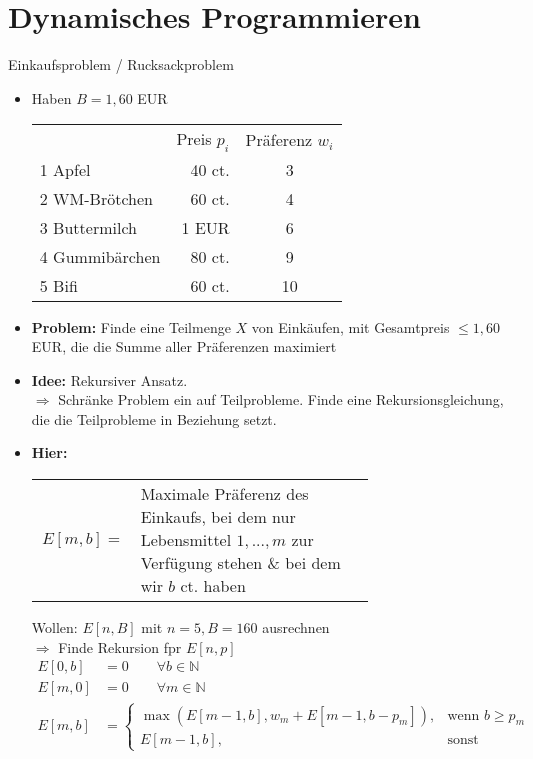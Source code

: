\section{Dynamisches Programmieren}
\Bsp Einkaufsproblem / Rucksackproblem
\begin{itemize}
 \item Haben $B = 1{,}60$ EUR
        \begin{center}
            \begin{tabular}{lr|c}
                & Preis $p_i$ & Präferenz $w_i$ \\
                1 Apfel & 40 ct. & 3 \\
                2 WM-Brötchen & 60 ct. & 4 \\
                3 Buttermilch & 1 EUR & 6 \\
                4 Gummibärchen & 80 ct. & 9 \\
                5 Bifi & 60 ct. & 10 \\ 
            \end{tabular}
        \end{center}
 \item \textbf{Problem:} Finde eine Teilmenge $X$ von Einkäufen, mit Gesamtpreis $\leq 1{,}60$ EUR, die die Summe aller Präferenzen maximiert
 \item \textbf{Idee:} Rekursiver Ansatz. \\
    $\Rightarrow$ Schränke Problem ein auf Teilprobleme. Finde eine Rekursionsgleichung, die die Teilprobleme in Beziehung setzt.
 \item \textbf{Hier:}
   \begin{center}
    \begin{tabular}{rp{0.7\linewidth}}
     $E[m,b] =$ & Maximale Präferenz des Einkaufs, bei dem nur Lebensmittel $1,...,m$ zur Verfügung stehen \& bei dem wir $b$ ct. haben
    \end{tabular}
   \end{center}
    Wollen: $E[n,B]$ mit $n = 5, B = 160$ ausrechnen\\
    $\Rightarrow$ Finde Rekursion fpr $E[n,p]$
    \begin{align*}
     E[0,b] &= 0 \qquad \forall b \in \mathbb{N} \\
     E[m,0] &= 0 \qquad \forall m \in \mathbb{N} \\
     E[m,b] &= \begin{cases}
                \max(E[m-1,b], w_m + E[m-1, b-p_m]), & \text{wenn } b \geq p_m \\
                E[m-1,b], & \text{sonst}
               \end{cases}
    \end{align*}
\end{itemize}
